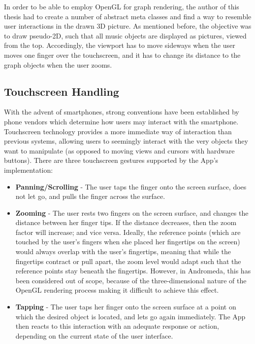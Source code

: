 In order to be able to employ OpenGL for graph rendering, the author of this thesis had to create a number of abstract meta classes and find a way to resemble user interactions in the drawn 3D picture. As mentioned before, the objective was to draw pseudo-2D, such that all music objects are displayed as pictures, viewed from the top. Accordingly, the viewport has to move sideways when the user moves one finger over the touchscreen, and it has to change its distance to the graph objects when the user zooms.

\subsection{Touchscreen Handling}

With the advent of smartphones, strong conventions have been established by phone vendors which determine how users may interact with the smartphone. Touchscreen technology provides a more immediate way of interaction than previous systems, allowing users to seemingly interact with the very objects they want to manipulate (as opposed to moving views and cursors with hardware buttons).
There are three touchscreen gestures supported by the App's implementation:

\begin{itemize}
	\item \textbf{Panning/Scrolling} - The user taps the finger onto the screen surface, does not let 
	go, and pulls the finger across the surface.
	\item \textbf{Zooming} - The user rests two fingers on the screen surface, and changes the distance	between her finger tips. If the distance decreases, then the zoom factor will increase; and vice versa.	Ideally, the reference points (which are touched by the user's fingers when she placed her fingertips on the screen) would always overlap with the user's fingertips, meaning that while the fingertips contract or pull apart, the zoom level would adapt such that the reference points stay beneath the fingertips. However, in Andromeda, this has been considered out of scope, because of the three-dimensional nature of the OpenGL	rendering process making it difficult to achieve this effect.
	\item \textbf{Tapping} - The user taps her finger onto the screen surface at a point on which the
	desired object is located, and lets go again immediately. The App then reacts to this interaction
	with an adequate response or action, depending on the current state of the user interface.
\end{itemize}


